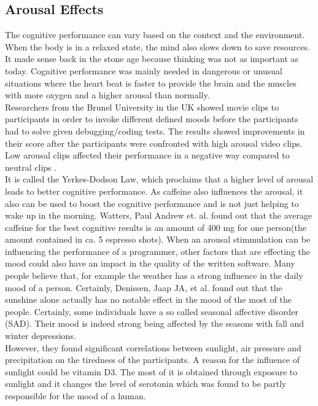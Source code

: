 \subsection{Arousal Effects}
The cognitive performance can vary based on the context and the environment. When the body is in a relaxed state, the mind also slows down to save resources. It made sense back in the stone age because thinking was not as important as today. Cognitive performance was mainly needed in dangerous or unusual situations where the heart beat is faster to provide the brain and the muscles with more oxygen and a higher arousal than normally.\\
Researchers from the Brunel University in the UK showed movie clips to participants in order to invoke different defined moods before the participants had to solve given debugging/coding tests. The results showed improvements in their score after the participants were confronted with high arousal video clips. Low arousal clips affected their performance in a negative way compared to neutral clips \cite{khan2007mood}.\\ 
It is called the Yerkes-Dodson Law, which proclaims that a higher level of arousal leads to better cognitive performance. As caffeine also influences the arousal, it also can be used to boost the cognitive performance and is not just helping to wake up in the morning. Watters, Paul Andrew et. al. \cite{watters1997caffeine} found out that the average caffeine for the best cognitive results is an amount of 400 mg for one person(the amount contained in ca. 5 espresso shots).
\bigbreak
When an arousal stimmulation can be influencing the performance of a programmer, other factors that are effecting the mood could also have an impact in the quality of the written software. Many people believe that, for example the weather has a strong influence in the daily mood of a person. Certainly, Denissen, Jaap JA, et al. \cite{denissen2008effects} found out that the sunshine alone actually has no notable effect in the mood of the most of the people. Certainly, some individuals have a so called seasonal affective disorder (SAD). Their mood is indeed strong being affected by the seasons with fall and winter depressions.\\ 
However, they found significant correlations between sunlight, air pressure and precipitation on the tiredness of the participants.
A reason for the influence of sunlight could be vitamin D3. The most of it is obtained through exposure to sunlight and it changes the level of serotonin which was found to be partly responsible for the mood of a human.

